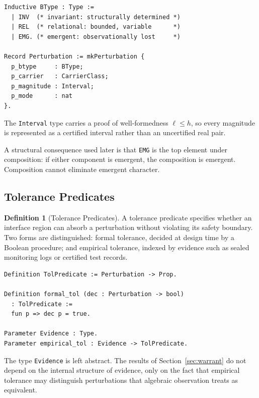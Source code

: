 \documentclass[12pt]{article}
\theoremstyle{plain}
\theoremstyle{definition}
\newtheorem{definition}[theorem]{Definition}
\theoremstyle{remark}
\begin{document}
\begin{lstlisting}[style=rocq,
caption={Boundary types and perturbation record.}]
Inductive BType : Type :=
  | INV  (* invariant: structurally determined *)
  | REL  (* relational: bounded, variable      *)
  | EMG. (* emergent: observationally lost     *)

Record Perturbation := mkPerturbation {
  p_btype     : BType;
  p_carrier   : CarrierClass;
  p_magnitude : Interval;
  p_mode      : nat
}.
\end{lstlisting}

The \texttt{Interval} type carries a proof of well-formedness
$\ell \leq h$, so every magnitude is represented as a certified
interval rather than an uncertified real pair.

A structural consequence used later is that \texttt{EMG} is the top
element under composition: if either component is emergent, the
composition is emergent.
Composition cannot eliminate emergent character.

\subsection{Tolerance Predicates}

\begin{definition}[Tolerance Predicates]

A tolerance predicate specifies whether an interface region can absorb
a perturbation without violating its safety boundary.
Two forms are distinguished: formal tolerance, decided at design time
by a Boolean procedure; and empirical tolerance, indexed by evidence
such as sealed monitoring logs or certified test records.

\end{definition}

\begin{lstlisting}[style=rocq,
caption={Tolerance predicates.}]
Definition TolPredicate := Perturbation -> Prop.

Definition formal_tol (dec : Perturbation -> bool)
  : TolPredicate :=
  fun p => dec p = true.

Parameter Evidence : Type.
Parameter empirical_tol : Evidence -> TolPredicate.
\end{lstlisting}

The type \texttt{Evidence} is left abstract.
The results of Section~\ref{sec:warrant} do not depend on the internal
structure of evidence, only on the fact that empirical tolerance may
distinguish perturbations that algebraic observation treats as
equivalent.
\end{document}
